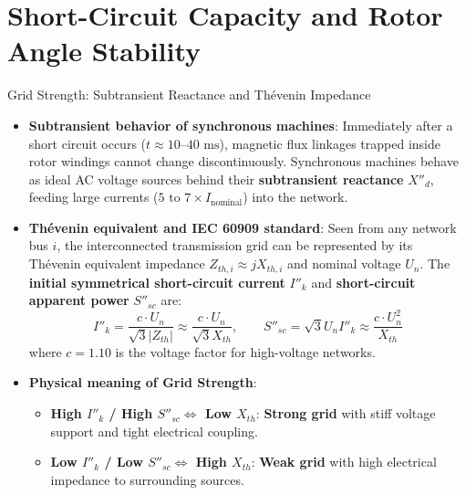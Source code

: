 \section{Short-Circuit Capacity and Rotor Angle Stability}

\begin{frame}[allowframebreaks]{Grid Strength: Subtransient Reactance and Thévenin Impedance}
\begin{itemize}
    \item \textbf{Subtransient behavior of synchronous machines}:
    Immediately after a short circuit occurs ($t \approx 10\text{--}40\text{ ms}$), magnetic flux linkages trapped inside rotor windings cannot change discontinuously. 
    Synchronous machines behave as ideal AC voltage sources behind their \textbf{subtransient reactance} $X''_d$, feeding large currents ($5\text{ to }7 \times I_{\text{nominal}}$) into the network.
    
    \item \textbf{Thévenin equivalent and IEC 60909 standard}:
    Seen from any network bus $i$, the interconnected transmission grid can be represented by its Thévenin equivalent impedance $Z_{th,i} \approx j X_{th,i}$ and nominal voltage $U_n$.
    The \textbf{initial symmetrical short-circuit current} $I''_k$ and \textbf{short-circuit apparent power} $S''_{sc}$ are:
    $$I''_k = \frac{c \cdot U_n}{\sqrt{3} |Z_{th}|} \approx \frac{c \cdot U_n}{\sqrt{3} X_{th}}, \qquad S''_{sc} = \sqrt{3} U_n I''_k \approx \frac{c \cdot U_n^2}{X_{th}}$$
    where $c = 1.10$ is the voltage factor for high-voltage networks.
    
    \item \textbf{Physical meaning of Grid Strength}:
    \begin{itemize}
        \item \textbf{High $I''_k$ / High $S''_{sc} \iff$ Low $X_{th}$}: \textbf{Strong grid} with stiff voltage support and tight electrical coupling.
        \item \textbf{Low $I''_k$ / Low $S''_{sc} \iff$ High $X_{th}$}: \textbf{Weak grid} with high electrical impedance to surrounding sources.
    \end{itemize}
\end{itemize}
\end{frame}

